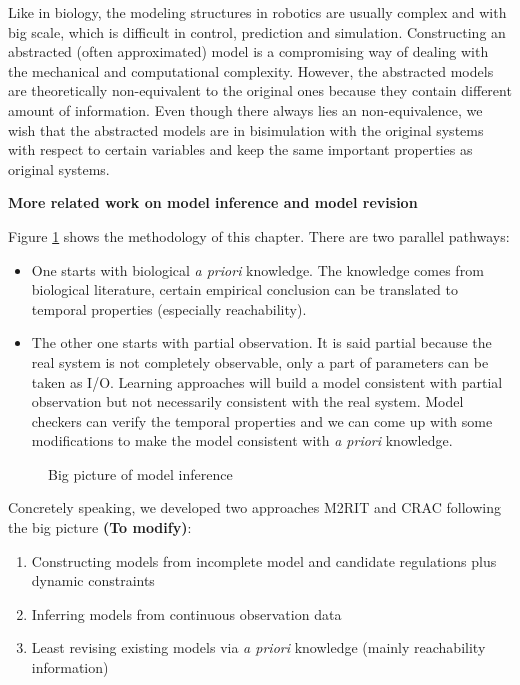 Like in biology, the modeling structures in robotics are usually complex and with big scale, which is difficult in control, prediction and simulation.
Constructing an abstracted (often approximated) model is a compromising way of dealing with the mechanical and computational complexity.
However, the abstracted models are theoretically non-equivalent to the original ones because they contain different amount of information.
Even though there always lies an non-equivalence, we wish that the abstracted models are in bisimulation with the original systems with respect to certain variables and keep the same important properties as original systems.

\textbf{More related work on model inference and model revision}

Figure \ref{fig:bigPicture} shows the methodology of this chapter.
There are two parallel pathways: 
\begin{itemize}
    \item One starts with biological \textit{a priori} knowledge.
    The knowledge comes from biological literature, certain empirical conclusion can be translated to temporal properties (especially reachability).
    \item The other one starts with partial observation.
    It is said partial because the real system is not completely observable, only a part of parameters can be taken as I/O. 
    Learning approaches will build a model consistent with partial observation but not necessarily consistent with the real system.
    Model checkers can verify the temporal properties and we can come up with some modifications to make the model consistent with \textit{a priori} knowledge.
\end{itemize}

\begin{figure}[ht]
    \centering
    
    \caption{Big picture of model inference}\label{fig:bigPicture}
\end{figure}

Concretely speaking, we developed two approaches M2RIT and CRAC following the big picture \textbf{(To modify)}:

\begin{enumerate}
    \item Constructing models from incomplete model and candidate regulations plus dynamic constraints
    \item Inferring models from continuous observation data
    \item Least revising existing models via \textit{a priori} knowledge (mainly reachability information)
\end{enumerate}

